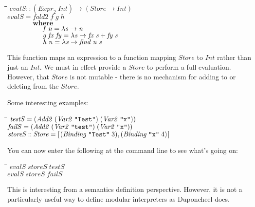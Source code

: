 \documentclass[10pt]{article}
\newlength{\lwidth}\setlength{\lwidth}{4.5cm}
\newlength{\cwidth}\setlength{\cwidth}{8mm} %
\newcommand{\Conid}[1]{\mathit{#1}}
\newcommand{\Varid}[1]{\mathit{#1}}
\begin{document}
\begin{tabbing}
\qquad\=\hspace{\lwidth}\=\hspace{\cwidth}\=\+\kill
${\Varid{evalS}\mathbin{::}(\Varid{Expr}_2\;\Conid{Int})\to (\Conid{Store}\to \Conid{Int})}$\\
${\Varid{evalS}\mathrel{=}\Varid{fold2}\;\Varid{f}\;\Varid{g}\;\Varid{h}}$\\
${\phantom{\Varid{evalS}\mathrel{=}\mbox{}}\mathbf{where}}$\\
${\phantom{\Varid{evalS}\mathrel{=}\mbox{}}\hskip1.50em\relax\Varid{f}\;\Varid{n}\mathrel{=}\lambda \Varid{s}\to \Varid{n}}$\\
${\phantom{\Varid{evalS}\mathrel{=}\mbox{}}\hskip1.50em\relax\Varid{g}\;\Varid{fx}\;\Varid{fy}\mathrel{=}\lambda \Varid{s}\to \Varid{fx}\;\Varid{s}\mathbin{+}\Varid{fy}\;\Varid{s}}$\\
${\phantom{\Varid{evalS}\mathrel{=}\mbox{}}\hskip1.50em\relax\Varid{h}\;\Varid{n}\mathrel{=}\lambda \Varid{s}\to \Varid{find}\;\Varid{n}\;\Varid{s}}$
\end{tabbing}
This function maps an expression to a function mapping \ensuremath{\Conid{Store}} to
\ensuremath{\Conid{Int}} rather than just an \ensuremath{\Conid{Int}}.  We must in effect provide a \ensuremath{\Conid{Store}}
to perform a full evaluation.  However, that \ensuremath{\Conid{Store}} is not mutable -
there is no mechanism for adding to or deleting from the \ensuremath{\Conid{Store}}.

Some interesting examples:

\begin{tabbing}
\qquad\=\hspace{\lwidth}\=\hspace{\cwidth}\=\+\kill
${\Varid{testS}\mathrel{=}(\Conid{Add2}\;(\Conid{Var2}\;\text{\tt \char34 Test\char34})\;(\Conid{Var2}\;\text{\tt \char34 x\char34}))}$\\
${\Varid{failS}\mathrel{=}(\Conid{Add2}\;(\Conid{Var2}\;\text{\tt \char34 test\char34})\;(\Conid{Var2}\;\text{\tt \char34 x\char34}))}$\\
${\Varid{storeS}\mathbin{::}\Conid{Store}\mathrel{=}[\mskip1.5mu (\Conid{Binding}\;\text{\tt \char34 Test\char34}\;\mathrm{3}),(\Conid{Binding}\;\text{\tt \char34 x\char34}\;\mathrm{4})\mskip1.5mu]}$
\end{tabbing}
You can now enter the following at the command line to see what's going on:

\begin{tabbing}
\qquad\=\hspace{\lwidth}\=\hspace{\cwidth}\=\+\kill
${\Varid{evalS}\;\Varid{storeS}\;\Varid{testS}}$\\
${}$\\
${\Varid{evalS}\;\Varid{storeS}\;\Varid{failS}}$
\end{tabbing}
This is interesting from a semantics definition perspective.  However,
it is not a particularly useful way to define modular interpreters as
Duponcheel does.
\end{document}
